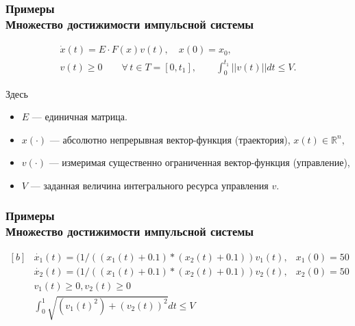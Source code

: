 \documentclass[hyperref={unicode=true},professionalfont]{beamer}
\newcommand{\stamp}{
	\begin{frame}[plain,noframenumbering]
		\begin{table}[h!]
			\flushright
			\vspace{5cm}
			\begin{adjustbox}{max width=0.7\textwidth}
				\begin{tabular}{
					|>{\footnotesize}p{0.8cm}|
					>{\footnotesize}p{0.8cm}|
					>{\footnotesize}p{2.2cm}|
					>{\footnotesize}p{1.1cm}|
					>{\footnotesize}p{0.8cm}|
					>{\footnotesize}p{5cm}|
					>{\footnotesize}p{0.1cm}|
					>{\footnotesize}p{0.1cm}|
					>{\footnotesize}p{0.1cm}|
					>{\footnotesize}p{0.8cm}|
					>{\footnotesize}p{1.4cm}|
				}
					\hline
					&&&&& \multicolumn{6}{>{\footnotesize}c|}{\multirow{3}{*}{\Large 0.043.00.00 ПЗ}} \\ \cline{1-5}
					&&&&& \multicolumn{6}{>{\footnotesize}c|}{} \\ \cline{1-5}
					Изм. & Лист & № Документа & Подпись & Дата & \multicolumn{6}{>{\footnotesize}c|}{} \\ \hline
					\multicolumn{2}{|>{\footnotesize}l|}{Разработал}
                    & Апанович Д.В. &  &  &
                                            \multirow{4}{5cm}{\centering
                                            Параллельный алгоритм
                                            численного решения
                                            анизотропного уравнения эйконала} & \multicolumn{3}{>{\footnotesize}l|}{Лит.} & Лист & Листов \\ \cline{1-5}\cline{7-11}
					\multicolumn{2}{|>{\footnotesize}l|}{Проверил}
                    & Казаков А.Л. &  &  &  & У & & & \insertframenumber & \inserttotalframenumber \\ \cline{1-5}\cline{7-11}
					\multicolumn{2}{|>{\footnotesize}l|}{Нормоконтролер}
                    & Казаков А.Л. &  &  &  & \multicolumn{5}{>{\footnotesize}l|}{} \\ \cline{1-5}
					\multicolumn{2}{|>{\footnotesize}l|}{} &  &  &  &  & \multicolumn{5}{>{\footnotesize}l|}{Кафедра АС, гр. ИСТм-16-1} \\ \cline{1-5}
					\multicolumn{2}{|>{\footnotesize}l|}{Утвердил}
                    & Бахвалов С.В. &  &  &  & \multicolumn{5}{>{\footnotesize}l|}{} \\ \hline

				\end{tabular}
			\end{adjustbox}
		\end{table}

	\end{frame}
}
\renewcommand{\stamp}{}
\begin{document}
\stamp

\begin{frame}
  \frametitle{Примеры \\ Множество достижимости импульсной системы}


\begin{equation}
  \label{system_s}
  \begin{array}{l}
    \dot{x}(t)=E \cdot F(x)v(t), \quad x(0)=x_0, \\[8pt]
    v(t)\geq 0  \qquad \forall\, t\in T = [0,t_1], \qquad
    \displaystyle\int_{0}^{t_1} ||v(t)||dt\leq V.
  \end{array} 
\end{equation}

Здесь
\begin{itemize}
  \item $E$ --- единичная матрица.
  \item $x(\cdot)$ --- абсолютно непрерывная вектор-функция
    (траектория), $x(t)\in {\mathbb R}^n,$
  \item $v(\cdot)$ --- измеримая существенно ограниченная
    вектор-функция (управление),
  
  \item $V$ --- заданная величина интегрального ресурса управления
    $v$.
\end{itemize}

\end{frame}
\stamp


\begin{frame}
  \frametitle{Примеры \\ Множество достижимости импульсной системы}

\begin{equation*}
  \begin{aligned}[b]
    &\dot{x_1}(t) = (1/((x_1(t)+0.1) * (x_2(t)+0.1))v_1(t), & x_1(0)=50\\
    &\dot{x_2}(t) = (1/((x_1(t)+0.1) * (x_2(t)+0.1))v_2(t), & x_2(0) = 50\\[8pt]
    &v_1(t) \ge 0, v_2(t) \ge 0 \\
    &\int_{0}^{1} \sqrt{(v_1(t)^2) + (v_2(t))^2} dt \le V
  \end{aligned}
\end{equation*}

  
\end{frame}
\stamp
\end{document}
